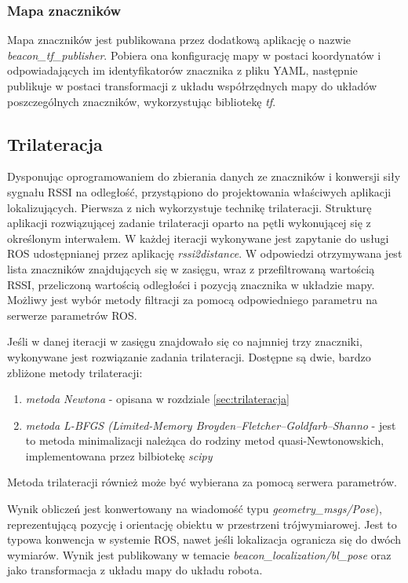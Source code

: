 \subsubsection{Mapa znaczników}
Mapa znaczników jest publikowana przez dodatkową aplikację o nazwie \textit{beacon{\_}tf{\_}publisher}. Pobiera ona konfigurację mapy w postaci koordynatów i odpowiadających im identyfikatorów znacznika z pliku YAML, następnie publikuje w postaci transformacji z układu współrzędnych mapy do układów poszczególnych znaczników, wykorzystując bibliotekę \textit{tf}. 


\subsection{Trilateracja}
Dysponując oprogramowaniem do zbierania danych ze znaczników i konwersji siły sygnału RSSI na odległość, przystąpiono do projektowania właściwych aplikacji lokalizujących. Pierwsza z nich wykorzystuje technikę trilateracji. 
Strukturę aplikacji rozwiązującej zadanie trilateracji oparto na pętli wykonującej się z określonym interwałem. W każdej iteracji wykonywane jest zapytanie do usługi ROS udostępnianej przez aplikację \textit{rssi2distance}. W odpowiedzi otrzymywana jest lista znaczników znajdujących się w zasięgu, wraz z przefiltrowaną wartością RSSI, przeliczoną wartością odległości i pozycją znacznika w układzie mapy. Możliwy jest wybór metody filtracji za pomocą odpowiedniego parametru na serwerze parametrów ROS. 

Jeśli w danej iteracji w zasięgu znajdowało się co najmniej trzy znaczniki, wykonywane jest rozwiązanie zadania trilateracji. Dostępne są dwie, bardzo zbliżone metody trilateracji:
\begin{enumerate}
 \item \textit{metoda Newtona} - opisana w rozdziale \ref{sec:trilateracja}
 \item \textit{metoda L-BFGS (Limited-Memory Broyden–Fletcher–Goldfarb–Shanno } - jest to metoda minimalizacji należąca do rodziny metod quasi-Newtonowskich, implementowana przez bilbiotekę \textit{scipy}
\end{enumerate}
Metoda trilateracji również może być wybierana za pomocą serwera parametrów. 

Wynik obliczeń jest konwertowany na wiadomość typu \textit{geometry{\_}msgs/Pose}), reprezentującą pozycję i orientację obiektu w przestrzeni trójwymiarowej. Jest to typowa konwencja w systemie ROS, nawet jeśli lokalizacja ogranicza się do dwóch wymiarów. Wynik jest publikowany w temacie \textit{beacon{\_}localization/bl{\_}pose} oraz jako transformacja z układu mapy do układu robota. 


